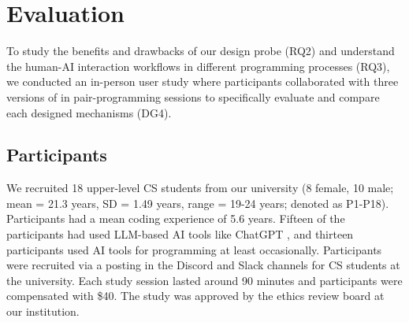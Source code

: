 \section{Evaluation}
To study the benefits and drawbacks of our design probe (RQ2) and understand the human-AI interaction workflows in different programming processes (RQ3), we conducted an in-person user study where participants collaborated with three versions of \sys{} in pair-programming sessions to specifically evaluate and compare each designed mechanisms (DG4). 

\subsection{Participants}
We recruited 18 upper-level CS students from our university (8 female, 10 male; mean = 21.3 years, SD = 1.49 years, range = 19-24 years; denoted as P1-P18). Participants had a mean coding experience of 5.6 years. Fifteen of the participants had used LLM-based AI tools like ChatGPT \cite{chatgpt}, and thirteen participants used AI tools for programming at least occasionally. Participants were recruited via a posting in the Discord and Slack channels for CS students at the university. Each study session lasted around 90 minutes and participants were compensated with \$40. The study was approved by the ethics review board at our institution.


